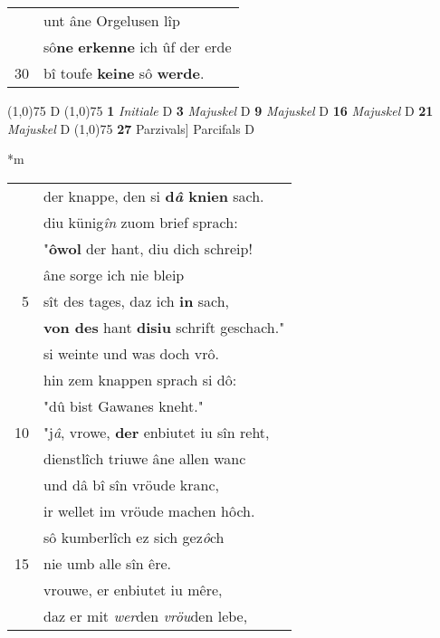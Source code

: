 \documentclass[8pt,a4paper,notitlepage]{article}
\begin{document}
\begin{table}[ht]
\begin{minipage}[t]{0.5\linewidth}
\begin{tabular}{rl}
 & unt âne Orgelusen lîp\\ 
 & sô\textbf{ne} \textbf{erkenne} ich ûf der erde\\ 
30 & bî toufe \textbf{keine} sô \textbf{werde}.\\ 
\end{tabular}
\scriptsize
\line(1,0){75} \newline
D \newline
\line(1,0){75} \newline
\textbf{1} \textit{Initiale} D  \textbf{3} \textit{Majuskel} D  \textbf{9} \textit{Majuskel} D  \textbf{16} \textit{Majuskel} D  \textbf{21} \textit{Majuskel} D  \newline
\line(1,0){75} \newline
\textbf{27} Parzivals] Parcifals D \newline
\end{minipage}
\hspace{0.5cm}
\begin{minipage}[t]{0.5\linewidth}
\small
\begin{center}*m
\end{center}
\begin{tabular}{rl}
 & der knappe, den si \textbf{d\textit{â} knien} sach.\\ 
 & diu künig\textit{în} zuom brief sprach:\\ 
 & "\textbf{ôwol} der hant, diu dich schreip!\\ 
 & âne sorge ich nie bleip\\ 
5 & sît des tages, daz ich \textbf{in} sach,\\ 
 & \textbf{von des} hant \textbf{disiu} schrift geschach."\\ 
 & si weinte und was doch vrô.\\ 
 & hin zem knappen sprach si dô:\\ 
 & "dû bist Gawanes kneht."\\ 
10 & "j\textit{â}, vrowe, \textbf{der} enbiutet iu sîn reht,\\ 
 & dienstlîch triuwe âne allen wanc\\ 
 & und dâ bî sîn vröude kranc,\\ 
 & ir wellet im vröude machen hôch.\\ 
 & sô kumberlîch ez sich gez\textit{ô}ch\\ 
15 & nie umb alle sîn êre.\\ 
 & vrouwe, er enbiutet iu mêre,\\ 
 & daz er mit \textit{wer}den \textit{vröu}den lebe,\\ 

\end{tabular}
\end{minipage}
\end{table}
\end{document}
